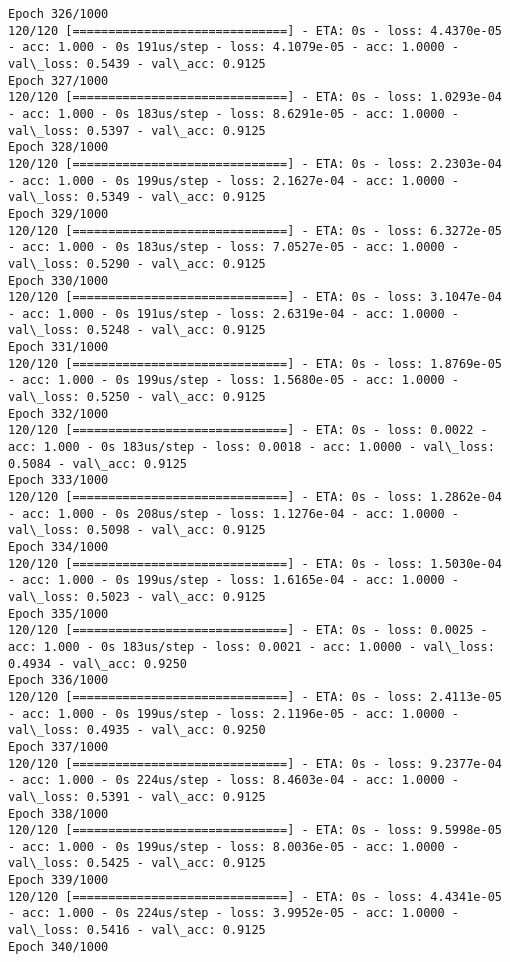 \documentclass[11pt]{article}
\begin{document}
\begin{Verbatim}[commandchars=\\\{\}]
Epoch 326/1000
120/120 [==============================] - ETA: 0s - loss: 4.4370e-05 - acc: 1.000 - 0s 191us/step - loss: 4.1079e-05 - acc: 1.0000 - val\_loss: 0.5439 - val\_acc: 0.9125
Epoch 327/1000
120/120 [==============================] - ETA: 0s - loss: 1.0293e-04 - acc: 1.000 - 0s 183us/step - loss: 8.6291e-05 - acc: 1.0000 - val\_loss: 0.5397 - val\_acc: 0.9125
Epoch 328/1000
120/120 [==============================] - ETA: 0s - loss: 2.2303e-04 - acc: 1.000 - 0s 199us/step - loss: 2.1627e-04 - acc: 1.0000 - val\_loss: 0.5349 - val\_acc: 0.9125
Epoch 329/1000
120/120 [==============================] - ETA: 0s - loss: 6.3272e-05 - acc: 1.000 - 0s 183us/step - loss: 7.0527e-05 - acc: 1.0000 - val\_loss: 0.5290 - val\_acc: 0.9125
Epoch 330/1000
120/120 [==============================] - ETA: 0s - loss: 3.1047e-04 - acc: 1.000 - 0s 191us/step - loss: 2.6319e-04 - acc: 1.0000 - val\_loss: 0.5248 - val\_acc: 0.9125
Epoch 331/1000
120/120 [==============================] - ETA: 0s - loss: 1.8769e-05 - acc: 1.000 - 0s 199us/step - loss: 1.5680e-05 - acc: 1.0000 - val\_loss: 0.5250 - val\_acc: 0.9125
Epoch 332/1000
120/120 [==============================] - ETA: 0s - loss: 0.0022 - acc: 1.000 - 0s 183us/step - loss: 0.0018 - acc: 1.0000 - val\_loss: 0.5084 - val\_acc: 0.9125
Epoch 333/1000
120/120 [==============================] - ETA: 0s - loss: 1.2862e-04 - acc: 1.000 - 0s 208us/step - loss: 1.1276e-04 - acc: 1.0000 - val\_loss: 0.5098 - val\_acc: 0.9125
Epoch 334/1000
120/120 [==============================] - ETA: 0s - loss: 1.5030e-04 - acc: 1.000 - 0s 199us/step - loss: 1.6165e-04 - acc: 1.0000 - val\_loss: 0.5023 - val\_acc: 0.9125
Epoch 335/1000
120/120 [==============================] - ETA: 0s - loss: 0.0025 - acc: 1.000 - 0s 183us/step - loss: 0.0021 - acc: 1.0000 - val\_loss: 0.4934 - val\_acc: 0.9250
Epoch 336/1000
120/120 [==============================] - ETA: 0s - loss: 2.4113e-05 - acc: 1.000 - 0s 199us/step - loss: 2.1196e-05 - acc: 1.0000 - val\_loss: 0.4935 - val\_acc: 0.9250
Epoch 337/1000
120/120 [==============================] - ETA: 0s - loss: 9.2377e-04 - acc: 1.000 - 0s 224us/step - loss: 8.4603e-04 - acc: 1.0000 - val\_loss: 0.5391 - val\_acc: 0.9125
Epoch 338/1000
120/120 [==============================] - ETA: 0s - loss: 9.5998e-05 - acc: 1.000 - 0s 199us/step - loss: 8.0036e-05 - acc: 1.0000 - val\_loss: 0.5425 - val\_acc: 0.9125
Epoch 339/1000
120/120 [==============================] - ETA: 0s - loss: 4.4341e-05 - acc: 1.000 - 0s 224us/step - loss: 3.9952e-05 - acc: 1.0000 - val\_loss: 0.5416 - val\_acc: 0.9125
Epoch 340/1000

\end{Verbatim}
\end{document}
